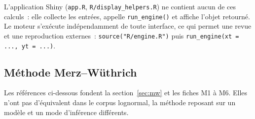 \documentclass[a4paper,11pt]{article}
\newcommand{\code}[1]{\texttt{\small #1}}
\begin{document}
\noindent
L'application Shiny (\code{app.R}, \code{R/display\_helpers.R}) ne contient
aucun de ces calculs~: elle collecte les entrées, appelle \code{run\_engine()} et
affiche l'objet retourné. Le moteur s'exécute indépendamment de toute interface,
ce qui permet une revue et une reproduction externes~:
\code{source("R/engine.R")} puis \code{run\_engine(xt = ..., yt = ...)}.

\subsection*{Méthode Merz--Wüthrich}

Les références ci-dessous fondent la section~\ref{sec:mw} et les fiches M1 à M6.
Elles n'ont pas d'équivalent dans le corpus lognormal, la méthode reposant sur un
modèle et un mode d'inférence différents.
\end{document}

